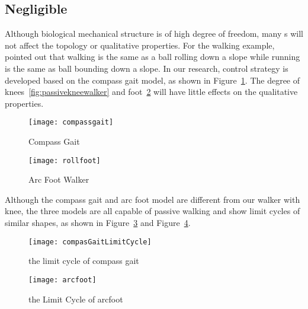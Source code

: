 {\subsection{Negligible \dof}
Although biological mechanical structure is of high degree of freedom, many \dof s will not affect the topology or qualitative properties.
For the walking example, \citet{Raibert1986} pointed out that walking is the same as a ball rolling down a slope while running is the same as ball bounding down a slope.
In our research, control strategy is developed based on the compass gait model, as shown in Figure~\ref{fig:compassgait}.
The degree of knees~\ref{fig:passivekneewalker} and foot~\ref{fig:arcfoot} will have little effects on the qualitative properties.
\begin{figure}[!htbp]
  \begin{center}
      \texttt{[image: compassgait]}
    \caption{Compass Gait}
    \label{fig:compassgait}
\end{center}
\end{figure}



\begin{figure}[!htbp]
  \begin{center}
      \texttt{[image: rollfoot]}
    \caption{Arc Foot Walker}
    \label{fig:arcfoot}
\end{center}
\end{figure}






Although the compass gait and arc foot model are different from  our walker with knee, the three models are all capable of passive walking and show limit cycles of similar shapes, as shown in Figure~\ref{fig:compassgaitlimitcycle} and Figure~\ref{fig:arcfootlimitcycle}.
\begin{figure}[!htbp]
  \begin{center}
      \texttt{[image: compasGaitLimitCycle]}
    \caption{the limit cycle of compass gait}
    \label{fig:compassgaitlimitcycle}
\end{center}
\end{figure}

\begin{figure}[!htbp]
  \begin{center}
      \texttt{[image: arcfoot]}
    \caption{the Limit Cycle of arcfoot}
    \label{fig:arcfootlimitcycle}
\end{center}
\end{figure}


}
